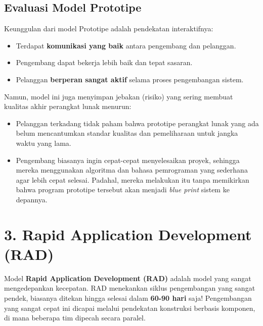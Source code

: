 \documentclass[12pt,a4paper]{article}
\begin{document}
\subsection{Evaluasi Model Prototipe}
Keunggulan dari model Prototipe adalah pendekatan interaktifnya:
\begin{itemize}
    \item Terdapat \textbf{komunikasi yang baik} antara pengembang dan pelanggan.
    \item Pengembang dapat bekerja lebih baik dan tepat sasaran.
    \item Pelanggan \textbf{berperan sangat aktif} selama proses pengembangan sistem.
\end{itemize}

Namun, model ini juga menyimpan jebakan (risiko) yang sering membuat kualitas akhir perangkat lunak menurun:
\begin{itemize}
    \item Pelanggan terkadang tidak paham bahwa prototipe perangkat lunak yang ada belum mencantumkan standar kualitas dan pemeliharaan untuk jangka waktu yang lama.
    \item Pengembang biasanya ingin cepat-cepat menyelesaikan proyek, sehingga mereka menggunakan algoritma dan bahasa pemrograman yang sederhana agar lebih cepat selesai. Padahal, mereka melakukan itu tanpa memikirkan bahwa program prototipe tersebut akan menjadi \textit{blue print} sistem ke depannya.
\end{itemize}

\newpage
\section{3. Rapid Application Development (RAD)}

Model \textbf{Rapid Application Development (RAD)} adalah model yang sangat mengedepankan kecepatan. RAD menekankan siklus pengembangan yang sangat pendek, biasanya ditekan hingga selesai dalam \textbf{60-90 hari} saja! Pengembangan yang sangat cepat ini dicapai melalui pendekatan konstruksi berbasis komponen, di mana beberapa tim dipecah secara paralel.
\end{document}
